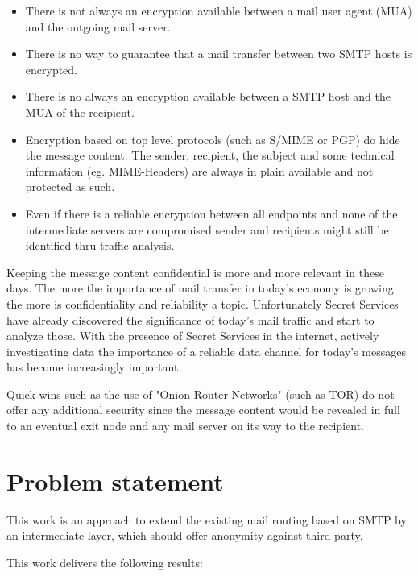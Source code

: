 \documentclass[11pt,a4paper]{book}
\begin{document}
\begin{itemize}
  \item There is not always an encryption available between a mail user agent (MUA) and the outgoing mail server.
	\item There is no way to guarantee that a mail transfer between two SMTP hosts is encrypted.
	\item There is no always an encryption available between a SMTP host and the MUA of the recipient.
  \item Encryption based on top level protocols (such as S/MIME or PGP) do hide the message content. The sender, recipient, the subject and some technical information (eg. MIME-Headers) are always in plain available and not protected as such.
	\item Even if there is a reliable encryption between all endpoints and none of the intermediate servers are compromised sender and recipients might still be identified thru traffic analysis.
\end{itemize}

Keeping the message content confidential is more and more relevant in these days. The more the importance of mail transfer in today's economy is growing the more is confidentiality and reliability a topic. Unfortunately Secret Services have already discovered the significance of today's mail traffic and start to analyze those. With the presence of Secret Services in the internet, actively investigating data the importance of a reliable data channel for today's messages has become increasingly important. 

Quick wins such as the use of "Onion Router Networks" (such as TOR) do not offer any additional security since the message content would be revealed in full to an eventual exit node and any mail server on its way to the recipient.

\section{Problem statement}
This work is an approach to extend the existing mail routing based on SMTP by an intermediate layer, which should offer anonymity against third party.\par

This work delivers the following results:
\end{document}
